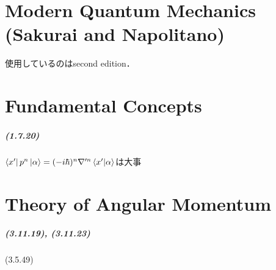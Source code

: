 \documentclass[a4paper]{ltjsreport}
\begin{document}
\chapter*{Modern Quantum Mechanics (Sakurai and Napolitano)}
使用しているのはsecond edition．

\chapter{Fundamental Concepts}
\paragraph{(1.7.20)}
$\bra{ x'} p^n \ket{\alpha} = (-i\hbar)^n\nabla'^n \braket{ x' | \alpha}$は大事

\setcounter{chapter}{2}
\chapter{Theory of Angular Momentum}
\paragraph{(3.11.19), (3.11.23)}
(3.5.49)
\end{document}

